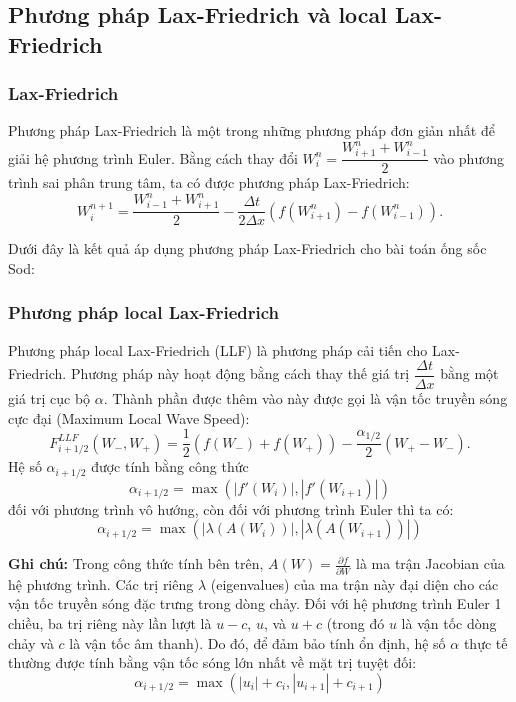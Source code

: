 \subsection{Phương pháp Lax-Friedrich và local Lax-Friedrich}
\subsubsection{Lax-Friedrich}
Phương pháp Lax-Friedrich là một trong những phương pháp đơn giản nhất để giải hệ phương trình Euler. Bằng cách thay đổi $W_i^n = \dfrac{W_{i+1}^n + W_{i-1}^n}{2}$ vào phương trình sai phân trung tâm, ta có được phương pháp Lax-Friedrich:
\[
W_i^{n+1} = \dfrac{W_{i-1}^n + W_{i+1}^n}{2} - \frac{\Delta t}{2\Delta x} \left( f(W_{i+1}^n) - f(W_{i-1}^n) \right).
\]

Dưới đây là kết quả áp dụng phương pháp Lax-Friedrich cho bài toán ống sốc Sod:


\subsubsection{Phương pháp local Lax-Friedrich}

Phương pháp local Lax-Friedrich (LLF) là phương pháp cải tiến cho Lax-Friedrich. Phương pháp này hoạt động bằng cách thay thế giá trị $\dfrac{\Delta t}{\Delta x}$ bằng một giá trị cục bộ $\alpha$. Thành phần được thêm vào này được gọi là vận tốc truyền sóng cực đại (Maximum Local Wave Speed):
\[
F_{i+1/2}^{LLF}(W_-, W_+) = \frac{1}{2} \left( f(W_-) + f(W_+) \right) - \dfrac{\alpha_{1/2}}{2} \left( W_+ - W_- \right).
\]
Hệ số $\alpha_{i+1/2}$ được tính bằng công thức
\[
\alpha_{i+1/2} = \max \left( |f'(W_i)|, |f'(W_{i+1})| \right)
\]
đối với phương trình vô hướng, còn đối với phương trình Euler thì ta có:
\[
\alpha_{i+1/2} = \max \left( |\lambda(A(W_i))|, |\lambda(A(W_{i+1}))| \right)
\]

\textbf{Ghi chú:}
Trong công thức tính bên trên, $A(W) = \frac{\partial f}{\partial W}$ là ma trận Jacobian của hệ phương trình. Các trị riêng $\lambda$ (eigenvalues) của ma trận này đại diện cho các vận tốc truyền sóng đặc trưng trong dòng chảy.
Đối với hệ phương trình Euler 1 chiều, ba trị riêng này lần lượt là $u-c$, $u$, và $u+c$ (trong đó $u$ là vận tốc dòng chảy và $c$ là vận tốc âm thanh). Do đó, để đảm bảo tính ổn định, hệ số $\alpha$ thực tế thường được tính bằng vận tốc sóng lớn nhất về mặt trị tuyệt đối:
\begin{equation*}
    \alpha_{i+1/2} = \max \left( |u_i| + c_i, |u_{i+1}| + c_{i+1} \right)
\end{equation*}

